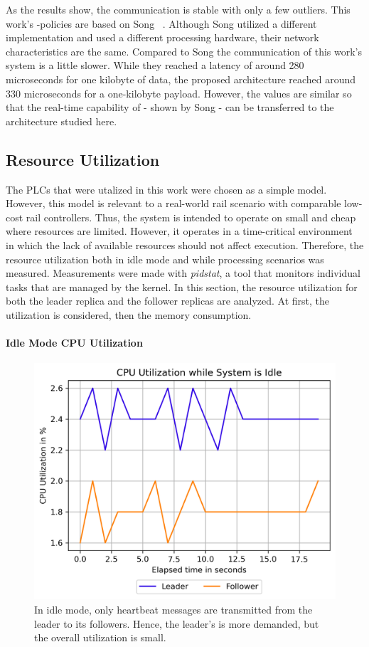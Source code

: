 As the results show, the communication is stable with only a few outliers.
This work's -policies are based on Song \etal~\cite{SongDDSInRealTimeSystems}.
Although Song \etal utilized a different  implementation and used a different processing hardware, their network characteristics are the same.
Compared to Song \etal the communication of this work's system is a little slower.
While they reached a latency of around 280 microseconds for one kilobyte of data, the proposed architecture reached around 330 microseconds for a one-kilobyte payload.
However, the values are similar so that the real-time capability of  - shown by Song \etal - can be transferred to the architecture studied here.


\subsection{Resource Utilization}

The PLCs that were utalized in this work were chosen as a simple model.
However, this model is relevant to a real-world rail scenario with comparable low-cost rail controllers.
Thus, the system is intended to operate on small and cheap  where resources are limited.
However, it operates in a time-critical environment in which the lack of available resources should not affect execution.
Therefore, the resource utilization both in idle mode and while processing scenarios was measured.
Measurements were made with \textit{pidstat}, a tool that monitors individual tasks that are managed by the  kernel.
In this section, the resource utilization for both the leader replica and the follower replicas are analyzed.
At first, the  utilization is considered, then the memory consumption.

\paragraph{Idle Mode CPU Utilization}

\begin{figure}[!hbt]
	\centering
	\includegraphics[width=0.8\linewidth]{images/plots/CPUUsageIdleTime}
	\caption{In idle mode, only heartbeat messages are transmitted from the leader to its followers. Hence, the leader's  is more demanded, but the overall utilization is small.}
	\label{fig:PlotCPUUsageIdleTime}
\end{figure}


